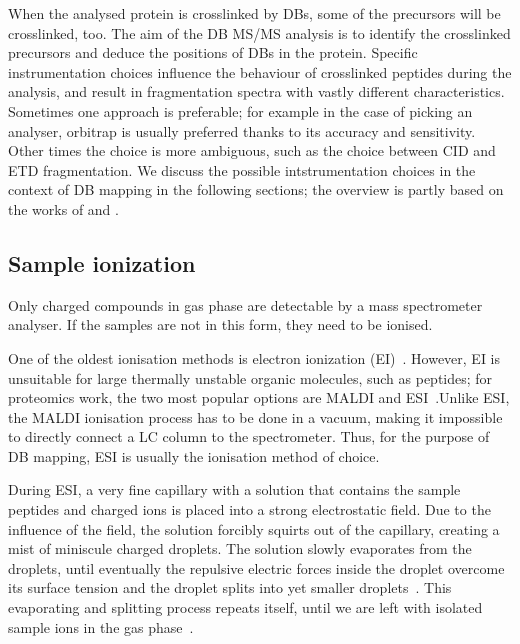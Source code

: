 When the analysed protein is crosslinked by DBs, some of the precursors will be crosslinked, too. The aim of the DB MS/MS analysis is to identify the crosslinked precursors and deduce the positions of DBs in the protein. Specific instrumentation choices influence the behaviour of crosslinked peptides during the analysis, and result in fragmentation spectra with vastly different characteristics. Sometimes one approach is preferable; for example in the case of picking an analyser, orbitrap is usually preferred thanks to its accuracy and sensitivity. Other times the choice is more ambiguous, such as the choice between CID and ETD fragmentation. We discuss the possible intstrumentation choices in the context of DB mapping in the following sections; the overview is partly based on the works of \citet{matthiesen2007mass} and \citet{gross2006mass}.

\subsection{Sample ionization}\label{sec:ionisation}

Only charged compounds in gas phase are detectable by a mass spectrometer analyser. If the samples are not in this form, they need to be ionised.

One of the oldest ionisation methods is electron ionization (EI)~\cite{field2013electron}. However, EI is unsuitable for large thermally unstable organic molecules, such as peptides; for proteomics work, the two most popular options are MALDI and ESI~\cite{caprioli1997molecular, fenn1990electrospray}.\@ Unlike ESI, the MALDI ionisation process has to be done in a vacuum, making it impossible to directly connect a LC column to the spectrometer. Thus, for the purpose of DB mapping, ESI is usually the ionisation method of choice.

During ESI, a very fine capillary with a solution that contains the sample peptides and charged ions is placed into a strong electrostatic field. Due to the influence of the field, the solution forcibly squirts out of the capillary, creating a mist of miniscule charged droplets. The solution slowly evaporates from the droplets, until eventually the repulsive electric forces inside the droplet overcome its surface tension and the droplet splits into yet smaller droplets~\cite{rayleigh1882xx}. This evaporating and splitting process repeats itself, until we are left with isolated sample ions in the gas phase~\cite{dole1968molecular,dole1968gas,fenn1989electrospray, fenn1990electrospray}.

